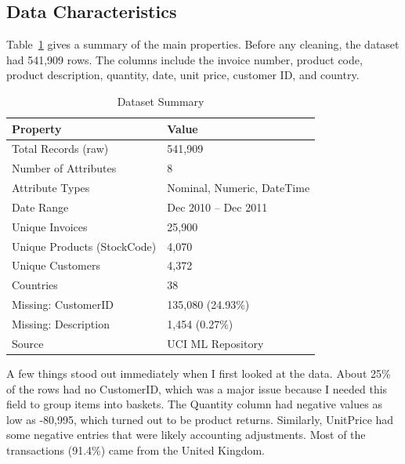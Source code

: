 \documentclass[conference]{IEEEtran}
\begin{document}
\subsection{Data Characteristics}

Table~\ref{tab:dataset} gives a summary of the main properties. Before any cleaning, the dataset had 541,909 rows. The columns include the invoice number, product code, product description, quantity, date, unit price, customer ID, and country.

\begin{table}[htbp]
    \caption{Dataset Summary}
    \begin{center}
        \begin{tabular}{|l|l|}
            \hline
            \textbf{Property} & \textbf{Value} \\
            \hline
            Total Records (raw) & 541,909 \\
            \hline
            Number of Attributes & 8 \\
            \hline
            Attribute Types & Nominal, Numeric, DateTime \\
            \hline
            Date Range & Dec 2010 -- Dec 2011 \\
            \hline
            Unique Invoices & 25,900 \\
            \hline
            Unique Products (StockCode) & 4,070 \\
            \hline
            Unique Customers & 4,372 \\
            \hline
            Countries & 38 \\
            \hline
            Missing: CustomerID & 135,080 (24.93\%) \\
            \hline
            Missing: Description & 1,454 (0.27\%) \\
            \hline
            Source & UCI ML Repository \\
            \hline
        \end{tabular}
        \label{tab:dataset}
    \end{center}
\end{table}

A few things stood out immediately when I first looked at the data. About 25\% of the rows had no CustomerID, which was a major issue because I needed this field to group items into baskets. The Quantity column had negative values as low as -80,995, which turned out to be product returns. Similarly, UnitPrice had some negative entries that were likely accounting adjustments. Most of the transactions (91.4\%) came from the United Kingdom.
\end{document}
